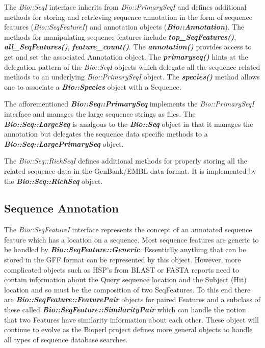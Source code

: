 \documentclass{article}
\begin{document}
\par
The \emph{Bio::SeqI} interface inherits from \emph{Bio::PrimarySeqI}
and defines additional methods for storing and retrieving sequence
annotation in the form of sequence features (\emph{Bio::SeqFeatureI})
and annotation objects (\emph{\bf Bio::Annotation}).  The methods for
manipulating sequence features include {\it \bf top\_SeqFeatures()}, 
{\it\bf all\_SeqFeatures()}, {\it \bf feature\_count()}.  The {\it \bf
annotation()} provides access to get and set the associated Annotation
object.  The {\it \bf primaryseq()} hints at the delegation
pattern of the \emph{Bio::SeqI} objects which delegate all the sequence related
methods to an underlying \emph{Bio::PrimarySeqI} object.  The {\it \bf
species()} method allows one to associate a \emph{\bf Bio::Species}
object with a Sequence.  

\par The afforementioned \emph{\bf Bio::Seq::PrimarySeq} implements
the \emph{Bio::PrimarySeqI} interface and manages the large sequence
strings as files.  The \emph{\bf Bio::Seq::LargeSeq} is analgous to
the \emph{\bf Bio::Seq} object in that it manages the annotation but
delegates the sequence data specific methods to a \emph{\bf
Bio::Seq::LargePrimarySeq} object.  

\par
The \emph{Bio::Seq::RichSeqI} defines additional methods for
properly storing all the related sequence data in the GenBank/EMBL
data format.  It is implemented by the \emph{\bf Bio::Seq::RichSeq}
object.

\subsection{Sequence Annotation} 

The \emph{Bio::SeqFeatureI} interface represents the concept of an
annotated sequence feature which has a location on a sequence.  Most
sequence features are generic to be handled by \emph{\bf
Bio::SeqFeature::Generic}.  Essentially anything that can be stored in
the GFF format can be represented by this object.  However, more
complicated objects such as HSP's from BLAST or FASTA reports need to
contain information about the Query sequence location and the Subject
(Hit) location and so must be the composition of two SeqFeatures.  To
this end there are \emph{\bf Bio::SeqFeature::FeaturePair} objects for
paired Features and a subclass of these called \emph{\bf
Bio::SeqFeature::SimilarityPair} which can handle the notion that two
Features have similarity information about each other.  These object
will continue to evolve as the Bioperl project defines more general
objects to handle all types of sequence database searches.  
\end{document}
